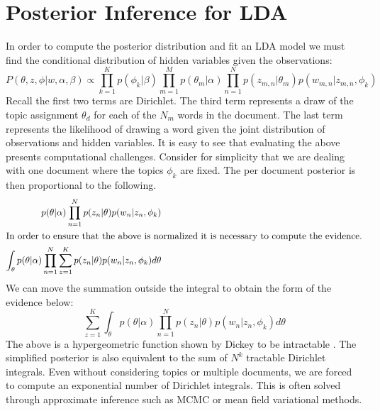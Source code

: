 \documentclass{article}%
\theoremstyle{definition}
\begin{document}
\section{Posterior Inference for LDA}
\label{sec:inference}
In order to compute the posterior distribution and fit an LDA model we must find the conditional distribution of hidden variables given the observations:
\begin{equation}
P(\theta, z, \phi | w, \alpha, \beta) \propto \prod\limits_{k=1}^{K}p(\phi_k | \beta) \prod\limits_{m=1}^{M}p(\theta_m|\alpha)\prod\limits_{n=1}^{N}p(z_{m,n}|\theta_m)p(w_{m,n}|z_{m,n},\phi_k)
\end{equation}
Recall the first two terms are Dirichlet. The third term represents a draw of the topic assignment $\theta_d$ for each of the $N_m$ words in the document. The last term represents the likelihood of drawing a word given the joint distribution of observations and hidden variables. It is easy to see that evaluating the above presents computational challenges. Consider for simplicity that we are dealing with one document where the topics $\phi_k$ are fixed. The per document posterior is then proportional to the following.
\begin{align}
p(\theta|\alpha)\prod\limits_{n=1}^{N}p(z_n|\theta)p(w_n|z_n,\phi_k) \\
\intertext{In order to ensure that the above is normalized it is necessary to compute the evidence.}
\int_\theta p(\theta|\alpha)\prod\limits_{n=1}^{N}\sum\limits_{z=1}^{K}p(z_n|\theta)p(w_n|z_n,\phi_k)d\theta
\end{align}
We can move the summation outside the integral to obtain the form of the evidence below:
\begin{equation}
\sum\limits_{z=1}^{K}\int_\theta p(\theta|\alpha)\prod\limits_{n=1}^{N}p(z_n|\theta)p(w_n|z_n,\phi_k) d\theta
\end{equation}
The above is a hypergeometric function shown by Dickey to be intractable \cite{10.2307/2288131}. The simplified posterior is also equivalent to the sum of $N^k$ tractable Dirichlet integrals. Even without considering topics or multiple documents, we are forced to compute an exponential number of Dirichlet integrals. This is often solved through approximate inference such as MCMC or mean field variational methods. 
\end{document}
